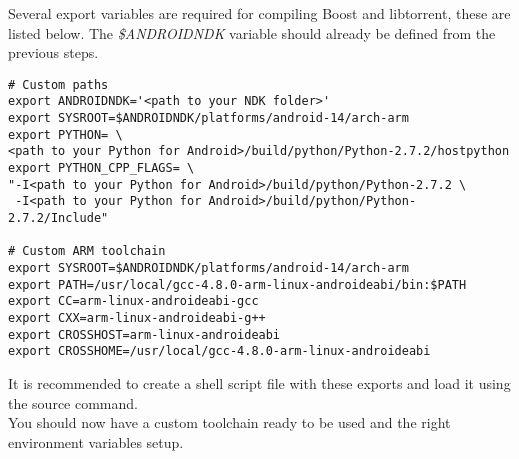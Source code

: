 	Several export variables are required for compiling Boost and libtorrent, these are listed below. The \emph{\$ANDROIDNDK} variable should already be defined from the previous steps.
	\begin{lstlisting}
# Custom paths
export ANDROIDNDK='<path to your NDK folder>'
export SYSROOT=$ANDROIDNDK/platforms/android-14/arch-arm
export PYTHON= \ 
<path to your Python for Android>/build/python/Python-2.7.2/hostpython
export PYTHON_CPP_FLAGS= \
"-I<path to your Python for Android>/build/python/Python-2.7.2 \
 -I<path to your Python for Android>/build/python/Python-2.7.2/Include"
	 
# Custom ARM toolchain
export SYSROOT=$ANDROIDNDK/platforms/android-14/arch-arm
export PATH=/usr/local/gcc-4.8.0-arm-linux-androideabi/bin:$PATH
export CC=arm-linux-androideabi-gcc
export CXX=arm-linux-androideabi-g++
export CROSSHOST=arm-linux-androideabi
export CROSSHOME=/usr/local/gcc-4.8.0-arm-linux-androideabi
	\end{lstlisting}
	It is recommended to create a shell script file with these exports and load it using the source command.\\
	You should now have a custom toolchain ready to be used and the right environment variables setup.